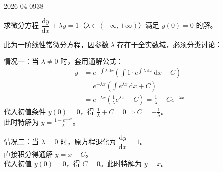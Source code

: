 \begin{mistake}{2026-04-09}{38}

\begin{problemcontent}
求微分方程 \( \dfrac{\mathrm{d}y}{\mathrm{d}x} + \lambda y = 1 \)（\( \lambda \in (-\infty, +\infty) \)）满足 \( y(0) = 0 \) 的解。
\end{problemcontent}

\begin{solutioncontent}
此为一阶线性常微分方程，因参数 \( \lambda \) 存在于全实数域，必须分类讨论：

情况一：当 \( \lambda \neq 0 \) 时，套用通解公式：
\[
\begin{aligned}
y &= e^{-\int \lambda\,\mathrm{d}x} \left( \int 1 \cdot e^{\int \lambda\,\mathrm{d}x}\,\mathrm{d}x + C \right) \\
 &= e^{-\lambda x} \left( \int e^{\lambda x}\,\mathrm{d}x + C \right) \\
 &= e^{-\lambda x} \left( \frac{1}{\lambda} e^{\lambda x} + C \right) = \frac{1}{\lambda} + C e^{-\lambda x}
\end{aligned}
\]
代入初值条件 \( y(0) = 0 \)，得 \( \frac{1}{\lambda} + C = 0 \Rightarrow C = -\frac{1}{\lambda} \)。\\
此时特解为 \( y = \frac{1 - e^{-\lambda x}}{\lambda} \)。

情况二：当 \( \lambda = 0 \) 时，原方程退化为 \( \dfrac{\mathrm{d}y}{\mathrm{d}x} = 1 \)。\\
直接积分得通解 \( y = x + C \)。\\
代入初值 \( y(0) = 0 \)，得 \( C = 0 \)。此时特解为 \( y = x \)。
\end{solutioncontent}


\end{mistake}
